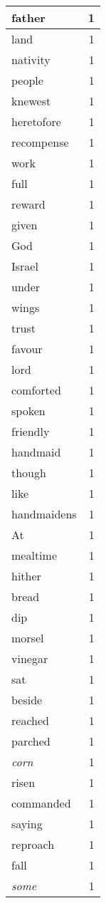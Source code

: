 \begin{center}
\begin{longtable}{l|r}
father & 1 \\ \hline
land & 1 \\ \hline
nativity & 1 \\ \hline
people & 1 \\ \hline
knewest & 1 \\ \hline
heretofore & 1 \\ \hline
recompense & 1 \\ \hline
work & 1 \\ \hline
full & 1 \\ \hline
reward & 1 \\ \hline
given & 1 \\ \hline
God & 1 \\ \hline
Israel & 1 \\ \hline
under & 1 \\ \hline
wings & 1 \\ \hline
trust & 1 \\ \hline
favour & 1 \\ \hline
lord & 1 \\ \hline
comforted & 1 \\ \hline
spoken & 1 \\ \hline
friendly & 1 \\ \hline
handmaid & 1 \\ \hline
though & 1 \\ \hline
like & 1 \\ \hline
handmaidens & 1 \\ \hline
At & 1 \\ \hline
mealtime & 1 \\ \hline
hither & 1 \\ \hline
bread & 1 \\ \hline
dip & 1 \\ \hline
morsel & 1 \\ \hline
vinegar & 1 \\ \hline
sat & 1 \\ \hline
beside & 1 \\ \hline
reached & 1 \\ \hline
parched & 1 \\ \hline
\emph{corn} & 1 \\ \hline
risen & 1 \\ \hline
commanded & 1 \\ \hline
saying & 1 \\ \hline
reproach & 1 \\ \hline
fall & 1 \\ \hline
\emph{some} & 1 \\ \hline

\end{longtable}
\end{center}
